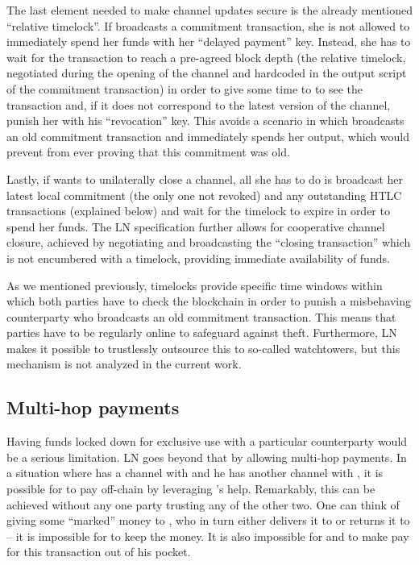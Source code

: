     The last element needed to make channel updates secure is the
    already mentioned ``relative timelock''. If \alice{} broadcasts a
    commitment transaction, she is not allowed to immediately spend her funds
    with her ``delayed payment'' key. Instead, she has to wait for the
    transaction to reach a pre-agreed block depth (the relative timelock,
    negotiated during the opening of the channel and hardcoded in the
    output script of the commitment transaction) in order to give some time to
    \bob{} to see the transaction and, if it does not correspond to the latest
    version of the channel, punish her with his ``revocation'' key. This avoids
    a scenario in which \alice{} broadcasts an old commitment transaction and
    immediately spends her output, which would prevent \bob{} from ever proving
    that this commitment was old.

    Lastly, if \alice{} wants to unilaterally close a channel, all she has to do
    is broadcast her latest local commitment (the only one not revoked)
    and any outstanding HTLC transactions (explained below) and wait
    for the timelock to expire in order to spend her funds. The LN specification
    further allows for cooperative channel closure, achieved by negotiating and
    broadcasting the ``closing transaction'' which is not encumbered
    with a timelock, providing immediate availability of funds.

    As we mentioned previously, timelocks provide specific time windows within
    which both
    parties have to check the blockchain in order to punish a misbehaving
    counterparty who  broadcasts an old commitment transaction. This means that
    parties have to be regularly online to safeguard against theft.
    Furthermore, LN makes it possible to trustlessly outsource this to
    so-called watchtowers, but this mechanism is not analyzed in the current
    work.

  \subsection{Multi-hop payments}
    Having funds locked down for exclusive use with a particular counterparty
    would be a serious limitation. LN goes beyond that by allowing multi-hop
    payments. In a situation where \alice{} has a channel with \bob{} and he has
    another channel with \charlie{}, it is possible for \alice{} to pay
    \charlie{} off-chain by leveraging \bob's help. Remarkably, this can be
    achieved without any one party trusting any of the other two. One can think
    of \alice{} giving some ``marked'' money to \bob{}, who in turn either
    delivers it to \charlie{} or returns it to \alice{} -- it is impossible for
    \bob{} to keep the money. It is also impossible for \alice{} and \charlie{}
    to make \bob{} pay for this transaction out of his pocket.

